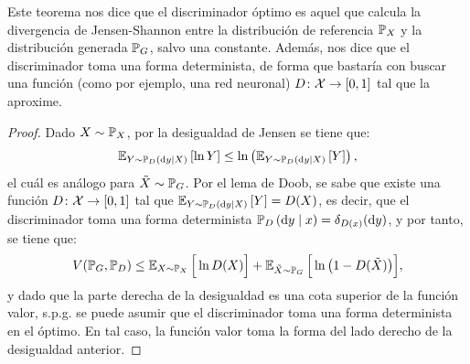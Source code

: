 {{{Este teorema nos dice que el discriminador óptimo es aquel que calcula la divergencia de Jensen-Shannon entre la distribución de referencia $\Prob_X$ y la distribución generada $\Prob_G$, salvo una constante. Además, nos dice que el discriminador toma una forma determinista, de forma que bastaría con buscar una función (como por ejemplo, una red neuronal) $D\colon\mathcal{X}\to [0, 1]$ tal que la aproxime.

\begin{proof}
    Dado $X \sim \Prob_X$, por la desigualdad de Jensen se tiene que:
    \begin{equation}
        \Exp_{Y \sim \Prob_D \left( \dd y \mid X \right)} \left[ \ln Y \right]
        \leq \ln \left( \Exp_{Y \sim \Prob_D \left( \dd y \mid X \right)} \left[ Y \right] \right),
    \end{equation}
    el cuál es análogo para $\tilde X \sim \Prob_G$. Por el lema de Doob, se sabe que existe una función $D \colon \mathcal{X} \to [0, 1]$ tal que $\Exp_{Y \sim \Prob_D \left( \dd y \mid X \right)} \left[ Y \right]
        = D(X)$,
    es decir, que el discriminador toma una forma determinista $\Prob_D \left( \dd y \mid x \right) = \delta_{D(x)}(\dd y)$,
    y por tanto, se tiene que:
    \begin{equation}
        V(\Prob_G, \Prob_D) \leq \Exp_{X \sim \Prob_X} \Big[ \ln D(X) \Big] + \Exp_{\tilde X \sim \Prob_G} \Big[ \ln \qty\big(1 - D(\tilde X)) \Big],
    \end{equation}
    y dado que la parte derecha de la desigualdad es una cota superior de la función valor, s.p.g. se puede asumir que el discriminador toma una forma determinista en el óptimo. En tal caso, la función valor toma la forma del lado derecho de la desigualdad anterior.


\end{proof}}}}

